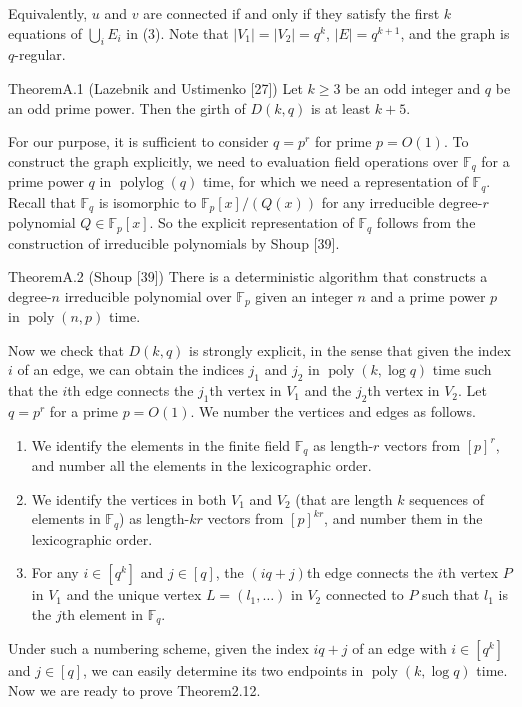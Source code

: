 Equivalently, $u$ and $v$ are connected if and only if they satisfy the first $k$ equations of $\bigcup_i E_i$ in (3). Note that $|V_1|=|V_2|=q^k$, $|E|=q^{k+1}$, and the graph is $q$-regular.
\begin{authorclaim}{TheoremA.1 (Lazebnik and Ustimenko [27])}
Let $k\ge3$ be an odd integer and $q$ be an odd prime power. Then the girth of $D(k,q)$ is at least $k+5$.
\end{authorclaim}
For our purpose, it is sufficient to consider $q=p^r$ for prime $p=O(1)$. To construct the graph explicitly, we need to evaluation field operations over $\mathbb F_q$ for a prime power $q$ in $\operatorname{polylog}(q)$ time, for which we need a representation of $\mathbb F_q$. Recall that $\mathbb F_q$ is isomorphic to $\mathbb F_p[x]/(Q(x))$ for any irreducible degree-$r$ polynomial $Q\in\mathbb F_p[x]$. So the explicit representation of $\mathbb F_q$ follows from the construction of irreducible polynomials by Shoup [39].
\begin{authorclaim}{TheoremA.2 (Shoup [39])}
There is a deterministic algorithm that constructs a degree-$n$ irreducible polynomial over $\mathbb F_p$ given an integer $n$ and a prime power $p$ in $\operatorname{poly}(n,p)$ time.
\end{authorclaim}
Now we check that $D(k,q)$ is strongly explicit, in the sense that given the index $i$ of an edge, we can obtain the indices $j_1$ and $j_2$ in $\operatorname{poly}(k,\log q)$ time such that the $i$th edge connects the $j_1$th vertex in $V_1$ and the $j_2$th vertex in $V_2$. Let $q=p^r$ for a prime $p=O(1)$. We number the vertices and edges as follows.
\begin{enumerate}
\item We identify the elements in the finite field $\mathbb F_q$ as length-$r$ vectors from $[p]^r$, and number all the elements in the lexicographic order.
\item We identify the vertices in both $V_1$ and $V_2$ (that are length $k$ sequences of elements in $\mathbb F_q$) as length-$kr$ vectors from $[p]^{kr}$, and number them in the lexicographic order.
\item For any $i\in[q^k]$ and $j\in[q]$, the $(iq+j)$th edge connects the $i$th vertex $P$ in $V_1$ and the unique vertex $L=(l_1,\ldots)$ in $V_2$ connected to $P$ such that $l_1$ is the $j$th element in $\mathbb F_q$.
\end{enumerate}
Under such a numbering scheme, given the index $iq+j$ of an edge with $i\in[q^k]$ and $j\in[q]$, we can easily determine its two endpoints in $\operatorname{poly}(k,\log q)$ time. Now we are ready to prove Theorem2.12.
